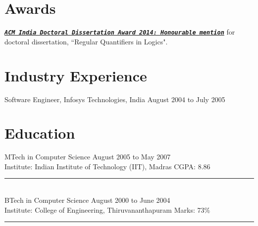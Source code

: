 \documentclass[margin]{res}
\begin{document}
\begin{resume}
\section{Awards}
\href{http://awards.acm.org/award_winners/sreejith_9923861.cfm}{\tt{\emph{\bf ACM India Doctoral Dissertation Award 2014: Honourable mention}}} for doctoral dissertation, ``Regular Quantifiers in Logics". 

\section{Industry Experience}
Software Engineer, Infosys Technologies, India \hfill August 2004 to July 2005
	
\section{Education} 
					MTech in Computer Science \hfill August 2005 to May 2007\\
					Institute: Indian Institute of Technology (IIT), Madras \hfill CGPA: 8.86 \\
					\noindent\rule{13cm}{0.4pt} \\
					BTech in Computer Science \hfill August 2000 to June 2004 \\
					Institute: College of Engineering, Thiruvananthapuram \hfill Marks: 73\% \\
					\noindent\rule{13cm}{0.4pt} 



\end{resume}
\end{document}
